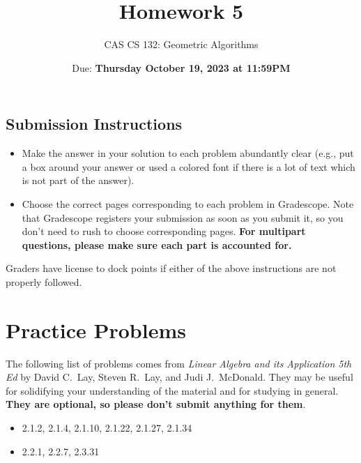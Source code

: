 \documentclass{article}
\title{
  Homework 5
}
\author{CAS CS 132: Geometric Algorithms}
\date{Due: \textbf{Thursday October 19, 2023 at 11:59PM}}
\theoremstyle{remark}
\begin{document}
\maketitle

\subsection*{Submission Instructions}
\begin{itemize}
\item Make the answer in your solution to each problem abundantly clear (e.g., put a box around your answer or used a colored font if there is a lot of text which is not part of the answer).
\item Choose the correct pages corresponding to each problem in Gradescope. Note that Gradescope registers your submission as soon as you submit it, so you don't need to rush to choose corresponding pages.
  \textbf{For multipart questions, please make sure each part is accounted for.}
\end{itemize}
Graders have license to dock points if either of the above instructions are not properly followed.


\section*{Practice Problems}

The following list of problems comes from \textit{Linear Algebra and its Application 5th Ed} by David C.\ Lay, Steven R.\ Lay, and Judi J.\ McDonald.
They may be useful for solidifying your understanding of the material and for studying in general.
\textbf{They are optional, so please don't submit anything for them}.

\begin{itemize}
\item 2.1.2, 2.1.4, 2.1.10, 2.1.22, 2.1.27, 2.1.34
\item 2.2.1, 2.2.7, 2.3.31
\end{itemize}

\pagebreak
\end{document}
